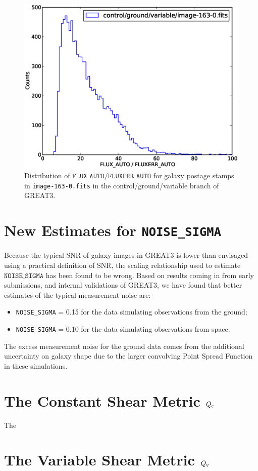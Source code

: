 \documentclass[preprint,11pt]{aastex}
\begin{document}
\begin{figure}\label{eq:snr}
\begin{center}
\includegraphics[width=\textwidth]{snr_cvg.eps}
\caption{Distribution of $\texttt{FLUX\_AUTO} /
  \texttt{FLUXERR\_AUTO}$ for galaxy postage stamps in
  \texttt{image-163-0.fits} in the control/ground/variable branch of GREAT3.}
\end{center}
\end{figure}

\section{New Estimates for \texttt{NOISE\_SIGMA}}
Because the typical SNR of galaxy images in GREAT3 is lower than
envisaged using a practical definition of SNR, the scaling
relationship used to estimate $\texttt{NOISE\_SIGMA}$ has been found
to be wrong.   Based on results coming in from early submissions, and
internal validations of GREAT3, we have found that better estimates of
the typical measurement noise are:
\begin{itemize}
\item[] \texttt{NOISE\_SIGMA} = 0.15 for the data simulating
  observations from the ground;
\item[] \texttt{NOISE\_SIGMA} = 0.10 for the data simulating
  observations from space.
\end{itemize}
The excess measurement noise for the ground data comes from the
additional uncertainty on galaxy shape due to the larger convolving
Point Spread Function in these simulations.

\section{The Constant Shear Metric $Q_{\rm c}$}\label{sec:qc}
The 

\section{The Variable Shear Metric $Q_{\rm v}$}\label{sec:qv}
\end{document}
